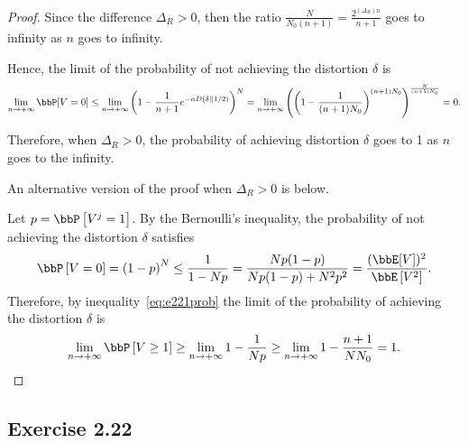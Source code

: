 \documentclass[11pt]{article}
\newcommand{\of}[1]{\left(#1\right)}
\newcommand{\off}[1]{\left[#1\right]}
\theoremstyle{plain}
\theoremstyle{definition}
\begin{document}
\begin{proof}
 	Since the difference $\Delta_R > 0$, then the ratio $\frac{N}{N_0(n+1)} = \frac{2^{(\Delta_R) n} }{n+1}$ goes to infinity as $n$ goes to infinity. 
 	
 	 Hence, the limit of the probability of not achieving the distortion $\delta$ is
 	 \begin{equation}
 	 	\lim_{n \rightarrow +\infty} \bbP[V = 0] \leq \lim_{n \rightarrow +\infty} \of{1 - \frac{1}{n+1} e^{-nD(\delta || 1/2)}}^N = \lim_{n \rightarrow +\infty}\of{ \of{1 - \frac{1}{(n+1)N_0}}^{(n+1)N_0}}^{\frac{N}{(n+1)N_0}} = 0.
 	 \end{equation}
 	 
 	 Therefore, when $\Delta_R > 0$, the probability of achieving distortion $\delta$ goes to 1 as $n$ goes to the infinity. 
 	 
 	 \vspace{0.2cm}
 	 
 	 An alternative version of the proof when $\Delta_R > 0$ is below.
 	 
 	 \vspace{0.2cm}
 	 Let $p = \bbP \off{V^j = 1}$. By the Bernoulli's inequality, the probability of not achieving the distortion $\delta$ satisfies
 	 \begin{equation}
 	 	\bbP \off{V = 0} = \of{1 - p}^N \leq \frac{1}{1 - Np} = \frac{Np(1-p)}{Np(1-p) + N^2 p^2} = \frac{(\bbE[V])^2}{\bbE \off{V^2}}.
 	 \end{equation}
 	  Therefore, by inequality~\eqref{eq:e221prob} the limit of the probability of achieving the distortion $\delta$ is
 	  \begin{equation}
 	  	\lim_{n \rightarrow +\infty}  \bbP \off{V \geq 1} \geq \lim_{n \rightarrow +\infty}   1- \frac{1}{N p} \geq \lim_{n \rightarrow +\infty}  1 - \frac{n+1}{N N_0 } = 1.
 	  \end{equation}
 \end{proof}
 
 \subsection{Exercise 2.22}
    
\end{document}
